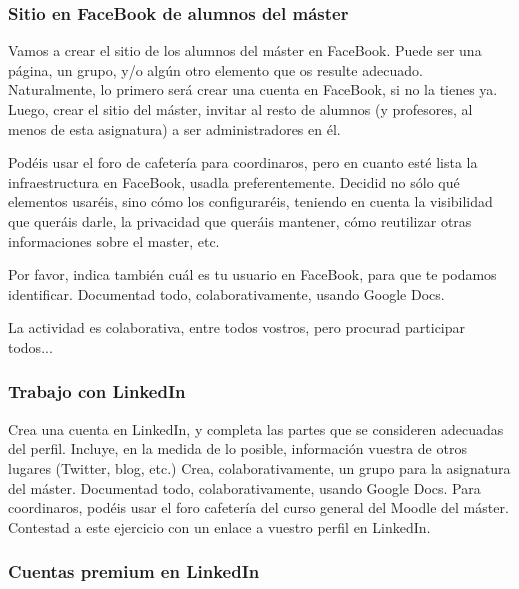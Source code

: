 \documentclass[a4paper,12pt]{article}
\begin{document}

\subsubsection{Sitio en FaceBook de alumnos del máster}
\label{sub:facebook}

Vamos a crear el sitio de los alumnos del máster en FaceBook. Puede ser una página, un grupo, y/o algún otro elemento que os resulte adecuado. Naturalmente, lo primero será crear una cuenta en FaceBook, si no la tienes ya. Luego, crear el sitio del máster, invitar al resto de alumnos (y profesores, al menos de esta asignatura) a ser administradores en él.

Podéis usar el foro de cafetería para coordinaros, pero en cuanto esté lista la infraestructura en FaceBook, usadla preferentemente. Decidid no sólo qué elementos usaréis, sino cómo los configuraréis, teniendo en cuenta la visibilidad que queráis darle, la privacidad que queráis mantener, cómo reutilizar otras informaciones sobre el master, etc.

Por favor, indica también cuál es tu usuario en FaceBook, para que te podamos identificar. Documentad todo, colaborativamente, usando Google Docs.

La actividad es colaborativa, entre todos vostros, pero procurad participar todos...

\subsubsection{Trabajo con LinkedIn}
\label{sub:linkedin}

Crea una cuenta en LinkedIn, y completa las partes que se consideren adecuadas del perfil. Incluye, en la medida de lo posible, información vuestra de otros lugares (Twitter, blog, etc.) Crea, colaborativamente, un grupo para la asignatura del máster. Documentad todo, colaborativamente, usando Google Docs. Para coordinaros, podéis usar el foro cafetería del curso general del Moodle del máster. Contestad a este ejercicio con un enlace a vuestro perfil en LinkedIn.

\subsubsection{Cuentas premium en LinkedIn}
\label{sub:linkedin-premium}
\end{document}
